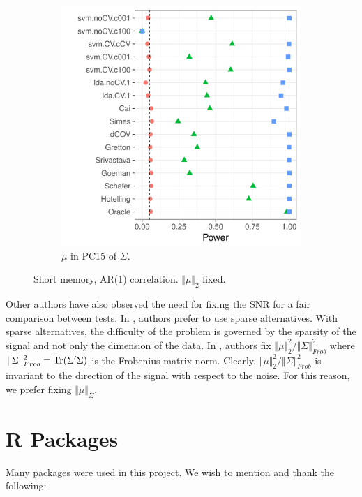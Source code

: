 \documentclass[oupdraft]{bio}
\begin{document}
\begin{figure}[h]
\begin{subfigure}[t]{0.45\columnwidth}
		\includegraphics[width=1\columnwidth]{"file31"}
		\caption{$\mu$ in PC15 of $\Sigma$.}  
		\label{fig:dependence_42}	
	\end{subfigure}
	\caption{Short memory, AR(1) correlation. $\Vert \mu \Vert_2$ fixed. }	
	\label{fig:dependence_4}		
\end{figure}

Other authors have also observed the need for fixing the SNR for a fair comparison between tests.
In \cite{ramdas2015decreasing}, authors prefer to use sparse alternatives.
With sparse alternatives, the difficulty of the problem is governed by the sparsity of the signal and not only the dimension of the data. 
In \cite{chen2010two}, authors fix $\Vert \mu \Vert_2^2/\Vert \Sigma \Vert^2_{Frob}$ where $\Vert \Sigma \Vert^2_{Frob}=\operatorname{Tr}(\Sigma'\Sigma)$ is the Frobenius matrix norm. 
Clearly, $\Vert \mu \Vert_2^2/\Vert \Sigma \Vert^2_{Frob}$ is invariant to the direction of the signal with respect to the noise. 
For this reason, we prefer fixing $\Vert \mu \Vert_\Sigma$.







\section{R Packages}

Many \R packages were used in this project. 
We wish to mention and thank the following:
\cite{mvtnorm,foreach,Hotelling,rpushbullet,sparsediscrim,glmnet,globaltest,kernlab,energy,hdtest}	



\newpage


\end{document}
